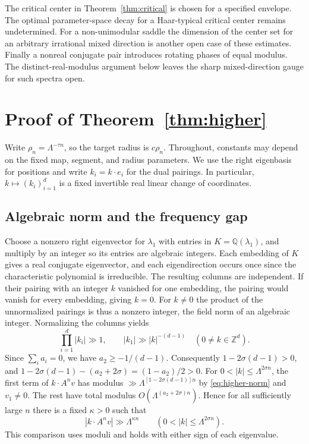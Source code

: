\documentclass[11pt,a4paper,reqno]{amsart}
\theoremstyle{definition}
\theoremstyle{remark}
\numberwithin{equation}{section}
\begin{document}
The critical center in Theorem~\ref{thm:critical} is chosen for a
specified envelope. The optimal parameter-space decay for a Haar-typical
critical center remains undetermined. For a non-unimodular saddle the
dimension of the center set for an arbitrary irrational mixed direction
is another open case of these estimates. Finally a nonreal conjugate pair
introduces rotating phases of equal modulus. The distinct-real-modulus
argument below leaves the sharp mixed-direction gauge for such spectra open.

\appendix
\section{Proof of Theorem~\ref{thm:higher}}
\label{app:higher}

Write \(\rho_n=\Lambda^{-\tau n}\), so the target radius is \(c\rho_n\). Throughout, constants may depend on the fixed map, segment, and radius parameters. We use the right eigenbasis for positions and write \(k_i=k\cdot e_i\) for the dual pairings. In particular, \(k\mapsto(k_i)_{i=1}^d\) is a fixed invertible real linear change of coordinates.

\subsection{Algebraic norm and the frequency gap}

Choose a nonzero right eigenvector for \(\lambda_1\) with entries in \(K=\mathbb Q(\lambda_1)\), and multiply by an integer so its entries are algebraic integers. Each embedding of \(K\) gives a real conjugate eigenvector, and each eigendirection occurs once since the characteristic polynomial is irreducible. The resulting columns are independent. If their pairing with an integer \(k\) vanished for one embedding, the pairing would vanish for every embedding, giving \(k=0\). For \(k\ne0\) the product of the unnormalized pairings is thus a nonzero integer, the field norm of an algebraic integer. Normalizing the columns yields
\begin{equation}\label{eq:higher-norm}
 \prod_{i=1}^d |k_i|\gg 1,\qquad
 |k_1|\gg |k|^{-(d-1)}\quad(0\ne k\in\mathbb Z^d).
\end{equation}
Since \(\sum_i a_i=0\), we have \(a_2\ge-1/(d-1)\). Consequently \(1-2\sigma(d-1)>0\), and \(1-2\sigma(d-1)-(a_2+2\sigma)=(1-a_2)/2>0\). For \(0<|k|\le\Lambda^{2\sigma n}\), the first term of \(k\cdot A^n v\) has modulus \(\gg\Lambda^{[1-2\sigma(d-1)]n}\) by \eqref{eq:higher-norm} and \(v_1\ne0\). The rest have total modulus \(O(\Lambda^{(a_2+2\sigma)n})\). Hence for all sufficiently large \(n\) there is a fixed \(\kappa>0\) such that
\begin{equation}\label{eq:higher-gap}
 |k\cdot A^n v|\gg\Lambda^{\kappa n}
 \qquad (0<|k|\le\Lambda^{2\sigma n}).
\end{equation}
This comparison uses moduli and holds with either sign of each eigenvalue.
\end{document}
